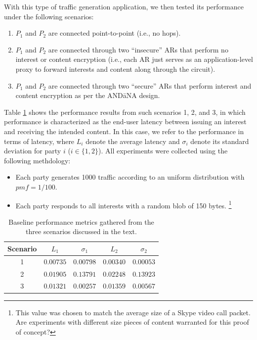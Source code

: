 \documentclass[10pt]{article}
\begin{document}
With this type of traffic generation application, we then tested its performance under the following scenarios:
\begin{enumerate}
  \item $P_1$ and $P_2$ are connected point-to-point (i.e., no hops).
  \item $P_1$ and $P_2$ are connected through two ``insecure'' ARs that perform no interest or content encryption (i.e., each AR just serves as an application-level proxy to forward interests and content along through the circuit).
  \item $P_1$ and $P_2$ are connected through two ``secure'' ARs that perform interest and content encryption as per the {\sf AND\=aNA} design.
\end{enumerate}
Table \ref{tab:baseline} shows the performance results from such scenarios 1, 2, and 3, in which performance is characterized as the end-user latency between issuing an interest and receiving the intended content. In this case, we refer to the performance in terms of latency, where $L_i$ denote the average latency and $\sigma_i$ denote its standard deviation for party $i$ ($i \in \{1,2\}$). All experiments were collected using the following methdology:
\begin{itemize}
  \item Each party generates 1000 traffic according to an uniform distribution with $pmf = 1/100$. 
  \item Each party responds to all interests with a random blob of 150 bytes. \footnote{This value was chosen to match the average size of a Skype video call packet. Are experiments with different size pieces of content warranted for this proof of concept?}
\end{itemize}

\begin{table}
\centering
\caption{Baseline performance metrics gathered from the three scenarios discussed in the text.}
\label{tab:baseline}
  \begin{tabular}{|c || c c | c c|} \hline
  Scenario & $L_1$ & $\sigma_1$ & $L_2$ & $\sigma_2$ \\ \hline
  1 & $0.00735$ & $0.00798$ & $0.00340$ & $0.00053$ \\
  2 & $0.01905$ & $0.13791$ & $0.02248$ & $0.13923$ \\
  3 & $0.01321$ & $0.00257$ & $0.01359$ & $0.00567$ \\ \hline
  \end{tabular}
\end{table}
\end{document}
